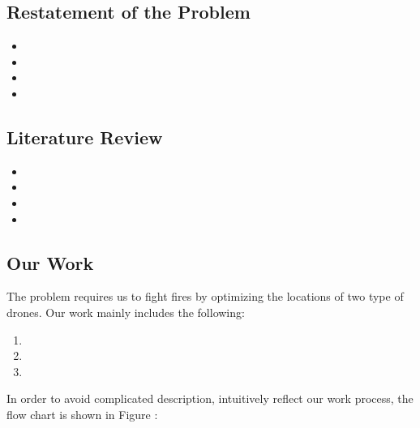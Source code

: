 \documentclass[12pt]{article}  %
\begin{document}
\subsection{Restatement of the Problem} %



\begin{itemize} %
\setlength{\parsep}{0ex} %
\setlength{\topsep}{2ex} %
\setlength{\itemsep}{1ex} %
\item 
\item 
\item
\item 
\end{itemize}

\subsection{Literature Review} %

\begin{itemize}
\setlength{\parsep}{0ex} %
\setlength{\topsep}{2ex} %
\setlength{\itemsep}{1ex} %
\item 

\item
 
\item 

\item 

\end{itemize}


\subsection{Our Work} %
The problem requires us to fight fires by optimizing the locations of two type of drones. Our work mainly includes the following:
\begin{enumerate}[\bfseries 1.]
    \setlength{\parsep}{0ex} %
    \setlength{\topsep}{0.5pt} %
    \setlength{\itemsep}{0.5pt} %
    \item 
    \item 
    \item 
\end{enumerate}
In order to avoid complicated description, intuitively reflect our work process, the flow chart is shown in Figure :

\vspace{-0.8cm}
\end{document}
